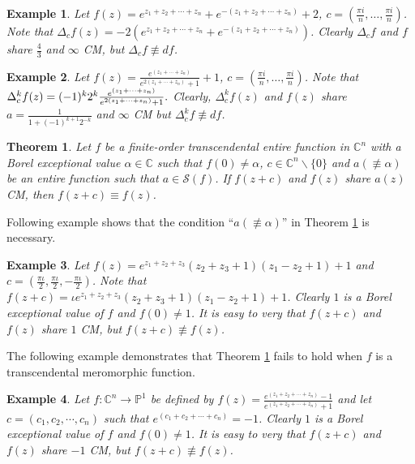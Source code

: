 \documentclass[11pt,reqno]{amsart}
\newtheorem{theo}{Theorem}[section]
\newtheorem{exm}{Example}[section]
\numberwithin{equation}{section}
\begin{document}
\begin{exm} Let $f(z)=e^{z_1+z_2+\cdots+z_n}+e^{-(z_1+z_2+\cdots+z_n)}+2$, $c=\left(\frac{\pi i}{n},\ldots,\frac{\pi i}{n}\right)$. Note that $\Delta_cf(z)=-2(e^{z_1+z_2+\cdots+z_n}+e^{-(z_1+z_2+\cdots+z_n)})$.
Clearly  $\Delta_cf$ and $f$ share $\frac{4}{3}$ and $\infty$ CM, but $\Delta_cf\not\equiv df$.
\end{exm}
 \begin{exm}
 	Let $f(z) = \frac{e^{(z_1+\cdots+z_n)} }{e^{2 (z_1+\cdots+z_n)} +1}+1$, $c=\left(\frac{\pi i}{n},\ldots,\frac{\pi i}{n}\right)$. Note that $\Delta_c^k f(z) = (-1)^{k}2^{k}\\ \frac{e^{(z_1+\cdots+z_n)} }{e^{2 (z_1+\cdots+z_n)} +1}.$	Clearly, $\Delta_c^k f(z)$ and  $f(z)$ share  $a = \frac{1}{1+(-1)^{k+1}2^{-k}}$ and $\infty$ CM but $\Delta_c^kf\not\equiv df$.
 \end{exm}
\begin{theo}\label{t2.3} Let $f$ be a finite-order transcendental entire function in $\mathbb{C}^n$ with a Borel exceptional value $\alpha \in \mathbb{C}$ such that $f(0)\neq \alpha$, $c \in \mathbb{C}^n\backslash \{0\}$ and $a(\not\equiv \alpha)$ be an entire function such that $a\in \mathcal{S}(f)$.
If $f(z+c)$ and $f(z)$ share $a(z)$ CM, then $f(z+c) \equiv f(z)$.
\end{theo}

Following example shows that the condition ``$a(\not\equiv \alpha)$'' in Theorem \ref{t2.3} is necessary.

\begin{exm} Let $f(z)=e^{z_1+z_2+z_3}(z_2+z_3+1)(z_1-z_2+1)+1$ and $c=\left(\frac{\pi \iota}{2},\frac{\pi \iota}{2},-\frac{\pi\iota}{2}\right)$. Note that $f(z+c)=\iota e^{z_1+z_2+z_3}(z_2+z_3+1)(z_1-z_2+1)+1$. Clearly $1$ is a Borel exceptional value of $f$ and $f(0)\neq 1$. It is easy to very that $f(z+c)$ and $f(z)$ share $1$ CM, but $f(z+c)\not\equiv f(z)$.
\end{exm}

The following example demonstrates that Theorem \ref{t2.3} fails to hold when $f$ is a transcendental meromorphic function.
\begin{exm} Let $f:\mathbb{C}^n\rightarrow \mathbb{P}^1$ be defined by 
$f(z)= \frac{e^{(z_1+z_2+\cdots+z_n)}-1}{e^{(z_1+z_2+\cdots+z_n)}+1}$ and let $c=\left(c_1,c_2,\cdots,c_n\right)$ such that $e^{(c_1+c_2+\cdots+c_n)}=-1$. Clearly $1$ is a Borel exceptional value of $f$ and $f(0)\neq 1$. It is easy to very that $f(z+c)$ and $f(z)$ share $-1$ CM, but $f(z+c)\not\equiv f(z)$.
\end{exm}
\end{document}
